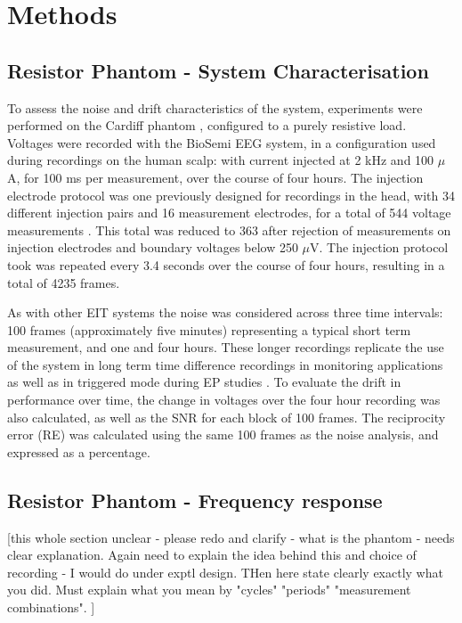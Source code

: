 \section{Methods}
\subsection{Resistor Phantom - System Characterisation}

To assess the noise and drift characteristics of the system, experiments were performed on the Cardiff phantom \cite{griffiths1995cole}, configured to a purely resistive load. Voltages were recorded with the BioSemi EEG system, in a configuration used during recordings on the human scalp: with current injected at 2 kHz and 100 $\mu$ A, for 100 ms per measurement, over the course of four hours. The injection electrode protocol was one previously designed for recordings in the head, with 34 different injection pairs and 16 measurement electrodes, for a total of 544 voltage measurements \cite{Fabrizi2009}. This total was reduced to 363 after rejection of measurements on injection electrodes and boundary voltages below 250 $\mu$V. The injection protocol took was repeated every 3.4 seconds over the course of four hours, resulting in a total of 4235 frames. 

As with other EIT systems \cite{oh2007multi} the noise was considered across three time intervals: 100 frames (approximately five minutes) representing a typical short term measurement, and one and four hours. These longer recordings replicate the use of the system in long term time difference recordings in monitoring applications \cite{fu2014use} \cite{adler2012whither} as well as in triggered mode during EP studies \cite{Aristovich_2016}. To evaluate the drift in performance over time, the change in voltages over the four hour recording was also calculated, as well as the SNR for each block of 100 frames. The reciprocity error (RE) was calculated using the same 100 frames as the noise analysis, and expressed as a percentage.

\subsection{Resistor Phantom - Frequency response}

[this whole section unclear - please redo and clarify - what is the phantom - needs clear explanation. Again need to explain the idea behind this and choice of recording - I would do under exptl design. THen here state clearly exactly what you did.  Must explain what you mean by "cycles" "periods" "measurement combinations". ] 





